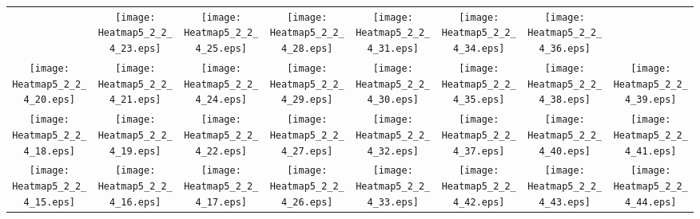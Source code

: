 \documentclass{standalone}
\begin{document}
\renewcommand{\arraystretch}{0}
\setlength{\tabcolsep}{0pt}
\begin{tabular}{ *8{c} }
 & \texttt{[image: Heatmap5\_2\_2\_4\_23.eps]} & \texttt{[image: Heatmap5\_2\_2\_4\_25.eps]} & \texttt{[image: Heatmap5\_2\_2\_4\_28.eps]} & \texttt{[image: Heatmap5\_2\_2\_4\_31.eps]} & \texttt{[image: Heatmap5\_2\_2\_4\_34.eps]} & \texttt{[image: Heatmap5\_2\_2\_4\_36.eps]} &  \\
\texttt{[image: Heatmap5\_2\_2\_4\_20.eps]} & \texttt{[image: Heatmap5\_2\_2\_4\_21.eps]} & \texttt{[image: Heatmap5\_2\_2\_4\_24.eps]} & \texttt{[image: Heatmap5\_2\_2\_4\_29.eps]} & \texttt{[image: Heatmap5\_2\_2\_4\_30.eps]} & \texttt{[image: Heatmap5\_2\_2\_4\_35.eps]} & \texttt{[image: Heatmap5\_2\_2\_4\_38.eps]} & \texttt{[image: Heatmap5\_2\_2\_4\_39.eps]} \\
\texttt{[image: Heatmap5\_2\_2\_4\_18.eps]} & \texttt{[image: Heatmap5\_2\_2\_4\_19.eps]} & \texttt{[image: Heatmap5\_2\_2\_4\_22.eps]} & \texttt{[image: Heatmap5\_2\_2\_4\_27.eps]} & \texttt{[image: Heatmap5\_2\_2\_4\_32.eps]} & \texttt{[image: Heatmap5\_2\_2\_4\_37.eps]} & \texttt{[image: Heatmap5\_2\_2\_4\_40.eps]} & \texttt{[image: Heatmap5\_2\_2\_4\_41.eps]} \\
\texttt{[image: Heatmap5\_2\_2\_4\_15.eps]} & \texttt{[image: Heatmap5\_2\_2\_4\_16.eps]} & \texttt{[image: Heatmap5\_2\_2\_4\_17.eps]} & \texttt{[image: Heatmap5\_2\_2\_4\_26.eps]} & \texttt{[image: Heatmap5\_2\_2\_4\_33.eps]} & \texttt{[image: Heatmap5\_2\_2\_4\_42.eps]} & \texttt{[image: Heatmap5\_2\_2\_4\_43.eps]} & \texttt{[image: Heatmap5\_2\_2\_4\_44.eps]} \\

\end{tabular}
\end{document}

